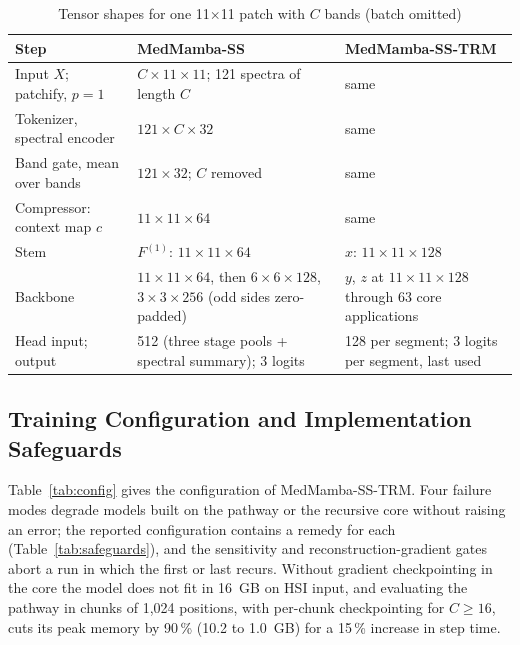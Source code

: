 \documentclass{svproc}
\begin{document}
\begin{table}[!htb]
\caption{Tensor shapes for one 11$\times$11 patch with $C$ bands (batch omitted)}
\label{tab:shapes}
\centering\scriptsize
\setlength{\tabcolsep}{3pt}
\begin{tabular}{@{}L{3.1cm}L{4.4cm}L{4.0cm}@{}}
\toprule
Step & MedMamba-SS & MedMamba-SS-TRM \\
\midrule
Input $X$; patchify, $p = 1$ & $C \times 11 \times 11$; 121 spectra of length $C$ & same \\
Tokenizer, spectral encoder & $121 \times C \times 32$ & same \\
Band gate, mean over bands & $121 \times 32$; $C$ removed & same \\
Compressor: context map $c$ & $11 \times 11 \times 64$ & same \\
Stem & $F^{(1)}$: $11 \times 11 \times 64$ & $x$: $11 \times 11 \times 128$ \\
Backbone & $11 \times 11 \times 64$, then $6 \times 6 \times 128$, $3 \times 3 \times 256$ (odd sides zero-padded) & $y$, $z$ at $11 \times 11 \times 128$ through 63 core applications \\
Head input; output & 512 (three stage pools + spectral summary); 3 logits & 128 per segment; 3 logits per segment, last used \\
\bottomrule
\end{tabular}
\end{table}

\subsection{Training Configuration and Implementation Safeguards}
Table~\ref{tab:config} gives the configuration of MedMamba-SS-TRM. Four failure modes degrade models built on the pathway or the recursive core without raising an error; the reported configuration contains a remedy for each (Table~\ref{tab:safeguards}), and the sensitivity and reconstruction-gradient gates abort a run in which the first or last recurs. Without gradient checkpointing in the core the model does not fit in 16~GB on HSI input, and evaluating the pathway in chunks of 1,024 positions, with per-chunk checkpointing for $C \geq 16$, cuts its peak memory by 90\,\% (10.2 to 1.0~GB) for a 15\,\% increase in step time.
\end{document}
